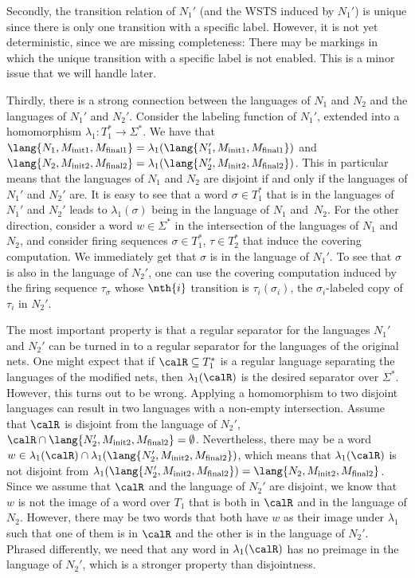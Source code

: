 \documentclass[../../diss.tex]{subfiles}
\begin{document}
Secondly, the transition relation of $N_1'$ (and the WSTS induced by $N_1'$) is unique since there is only one transition with a specific label.
However, it is not yet deterministic, since we are missing completeness:
There may be markings in which the unique transition with a specific label is not enabled.
This is a minor issue that we will handle later.

Thirdly, there is a strong connection between the languages of $N_1$ and $N_2$ and the languages of $N_1'$ and $N_2'$.
Consider the labeling function  of $N_1'$, extended into a homomorphism $\lambda_1 \colon T_1^* \to \Sigma^*$.
We have that $\lang{N_1,M_{\init1},M_{\final1}} = \lambda_1 ( \lang{N_1',M_{\init1},M_{\final1}}   )$
and $\lang{N_2,M_{\init2},M_{\final2}} = \lambda_1 ( \lang{N_2',M_{\init2},M_{\final2}}   )$.
This in particular means that the languages of $N_1$ and $N_2$ are disjoint if and only if the languages of $N_1'$ and $N_2'$ are.
It is easy to see that a word $\sigma \in T_1^*$ that is in the languages of $N_1'$ and $N_2'$ leads to $\lambda_1(\sigma)$ being in the language of $N_1$ and~$N_2$.
For the other direction, consider a word $w \in \Sigma^*$ in the intersection of the languages of $N_1$ and $N_2$, and consider firing sequences $\sigma \in T_1^*$, $\tau \in T_2^*$ that induce the covering computation.
We immediately get that $\sigma$ is in the language of $N_1'$.
To see that $\sigma$ is also in the language of $N_2'$, one can use the covering computation induced by the firing sequence $\tau_\sigma$ whose $\nth{i}$ transition is $\tau_i (\sigma_i)$, the $\sigma_i$-labeled copy of $\tau_i$ in $N_2'$.

The most important property is that a regular separator for the languages $N_1'$ and $N_2'$ can be turned in to a regular separator for the languages of the original nets.
One might expect that if $\calR \subseteq T_1^*$ is a regular language separating the languages of the modified nets, then $\lambda_1(\calR)$ is the desired separator over $\Sigma^*$.
However, this turns out to be wrong.
Applying a homomorphism to two disjoint languages can result in two languages with a non-empty intersection.
Assume that $\calR$ is disjoint from the language of $N_2'$, $\calR \cap \lang{N_2',M_{\init2},M_{\final2}} = \emptyset$.
Nevertheless, there may be a word $w \in \lambda_1(\calR) \cap \lambda_1(\lang{N_2',M_{\init2},M_{\final2}})$, which means that $\lambda_1(\calR)$ is not disjoint from $\lambda_1(\lang{N_2',M_{\init2},M_{\final2}}) = \lang{N_2,M_{\init2},M_{\final2}}$.
Since we assume that $\calR$ and the language of $N_2'$ are disjoint, we know that $w$ is not the image of a word over $T_1$ that is both in $\calR$ and in the language of $N_2$.
However, there may be two words that both have $w$ as their image under $\lambda_1$ such that one of them is in $\calR$ and the other is in the language of $N_2'$.
Phrased differently, we need that any word in $\lambda_1(\calR)$ has no preimage in the language of $N_2'$, which is a stronger property than disjointness.
\end{document}
